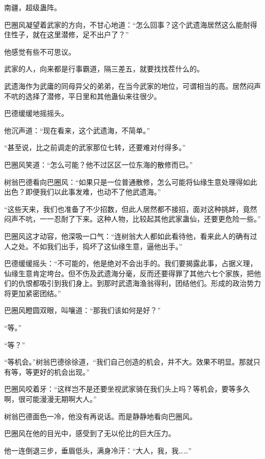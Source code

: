
\begin{this_body}

南疆，超级蛊阵。

巴圈风凝望着武家的方向，不甘心地道：“怎么回事？这个武遗海居然这么能耐得住性子，就在这里潜修，足不出户了？”

他感觉有些不可思议。

武家的人，向来都是行事霸道，隔三差五，就要找找茬什么的。

武遗海作为武庸的同母异父的弟弟，在当今武家的地位，可谓相当的高。居然闷声不吭的选择了潜修，平日里和其他蛊仙来往很少。

巴德缓缓地摇摇头。

他沉声道：“现在看来，这个武遗海，不简单。”

“甚至说，比之前调走的武家那位七转，还要难对付得多。”

巴圈风笑道：“怎么可能？他不过区区一位东海的散修而已。”

树翁巴德看向巴圈风：“如果只是一位普通散修，怎么可能将仙缘生意处理得如此出色？即便我们以此事发难，也动不了他武遗海。”

“这些天来，我们也准备了不少招数，但此人居然都不接招，面对这种挑衅，竟然闷声不吭，一一忍耐了下来。这种人物，比较起其他武家蛊仙，还要更危险一些。”

巴圈风这才动容，他深吸一口气：“连树翁大人都如此看待他，看来此人的确有过人之处。不如我们出手，捣坏了这仙缘生意，逼他出手。”

巴德缓缓摇头：“不可能的，他是绝对不会出手的。我们要揭露此事，占据义理，仙缘生意肯定垮台。但不伤及武遗海分毫，反而还要得罪了其他六七个家族，把他们的仇恨都吸引到我们身上。到那时武遗海渔翁得利，团结他们。形成的政治势力将更加紧密团结。”

巴圈风瞪圆双眼，叫嚷道：“那我们该如何是好？”

“等。”

“等？”

“等机会。”树翁巴德徐徐道，“我们自己创造的机会，并不大。效果不明显。那就只有等，等更好的机会出现。”

巴圈风咬着牙：“这样岂不是还要坐视武家骑在我们头上吗？等机会，要等多久啊，很可能漫漫无期啊大人。”

树翁巴德面色一冷，他没有再说话。而是静静地看向巴圈风。

巴圈风在他的目光中，感受到了无以伦比的巨大压力。

他一连倒退三步，垂眉低头，满身冷汗：“大人，我，我……”


\end{this_body}
